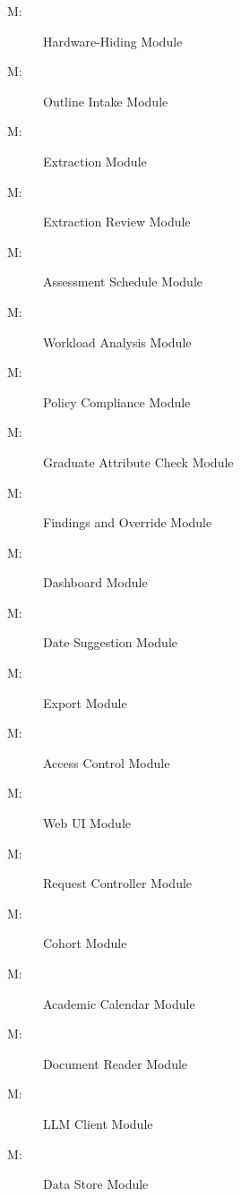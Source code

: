 \documentclass[12pt, titlepage]{article}
\newcounter{mnum}
\newcommand{\mthemnum}{M\themnum}
\begin{document}
\begin{description}
\item [ \mthemnum \label{mHH}:] Hardware-Hiding Module
\item [ \mthemnum \label{mIntake}:] Outline Intake Module
\item [ \mthemnum \label{mExtract}:] Extraction Module
\item [ \mthemnum \label{mReview}:] Extraction Review Module
\item [ \mthemnum \label{mSchedule}:] Assessment Schedule Module
\item [ \mthemnum \label{mWorkload}:] Workload Analysis Module
\item [ \mthemnum \label{mPolicy}:] Policy Compliance Module
\item [ \mthemnum \label{mGA}:] Graduate Attribute Check Module
\item [ \mthemnum \label{mFindings}:] Findings and Override Module
\item [ \mthemnum \label{mDashboard}:] Dashboard Module
\item [ \mthemnum \label{mSuggest}:] Date Suggestion Module
\item [ \mthemnum \label{mExport}:] Export Module
\item [ \mthemnum \label{mAccess}:] Access Control Module
\item [ \mthemnum \label{mUI}:] Web UI Module
\item [ \mthemnum \label{mControl}:] Request Controller Module
\item [ \mthemnum \label{mCohort}:] Cohort Module
\item [ \mthemnum \label{mCalendar}:] Academic Calendar Module
\item [ \mthemnum \label{mReader}:] Document Reader Module
\item [ \mthemnum \label{mLLM}:] LLM Client Module
\item [ \mthemnum \label{mStore}:] Data Store Module
\end{description}
\end{document}
